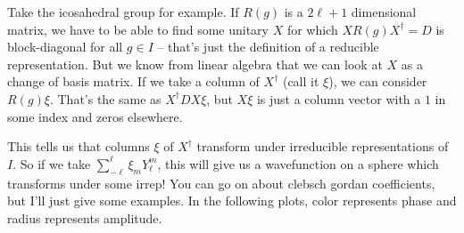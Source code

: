\documentclass[12pt, letterpaper]{article}
\theoremstyle{definition} %
\begin{document}
Take the icosahedral group for example. If $R(g)$ is a $2\ell+1$ dimensional matrix,
we have to be able to find some unitary $X$ for which $X R(g) X^{\dagger}=D$ is block-diagonal for all $g\in I$ -- that's just the definition of
a reducible representation. But we know from linear algebra that we can look at $X$ as a change of basis matrix. If we take a column of $X^\dagger$ (call it $\xi$), we can consider $R(g)\xi$. That's the same as $X^\dagger D X \xi$, but $X\xi$ is just a column vector with a $1$ in some
index and zeros elsewhere. 

This tells us that columns $\xi$ of $X^\dagger$ transform under irreducible representations of $I$. So if we take $\sum_{-\ell}^\ell \xi_m Y_\ell^m$, this will give us a wavefunction on a sphere which  transforms under some irrep! You can go on about clebsch gordan coefficients, but 
I'll just give some examples. In the following plots, color represents phase and radius represents amplitude. 
\end{document}
